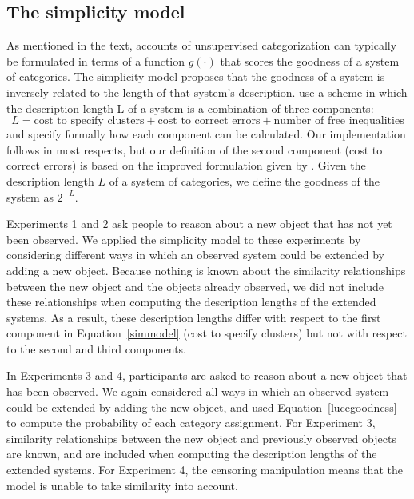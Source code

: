 \documentclass[doc]{apa6}
\begin{document}
\subsection{The simplicity model}

As mentioned in the text, accounts of unsupervised categorization can
typically be formulated in terms of a function $g(\cdot)$ that
scores the goodness of a system of categories. The simplicity model
proposes that the goodness of a system is inversely related to the length
of that system's description.  
 use a scheme in which the
description length L of a system is a combination of three components:
\begin{equation}
L =  \text{cost to specify clusters} +  \text{cost to correct errors} + \text{number of free inequalities}
\label{simmodel}
\end{equation}
and specify formally how each component can be calculated. Our implementation
follows  in most respects, but our definition of
the second component (cost to correct errors) is based on the improved
formulation given by .  Given the description length $L$ of a
system of categories, we define the goodness of the system as $2^{-L}$.

Experiments 1 and 2 ask people to reason about a new object that has not yet
been observed. We applied the simplicity model to these experiments by
considering different ways in which an observed system could be extended
by adding a new object. Because nothing is known about the similarity
relationships between the new object and the objects already observed, we did
not include these relationships when computing the description lengths of
the extended systems.  As a result, these description lengths differ with
respect to the first component in Equation~\ref{simmodel} (cost to
specify clusters) but not with respect to the second and third components.

In Experiments 3 and 4, participants are asked to reason about a new object that has been observed.  We again considered all ways in which an observed system could be extended by adding the new object, and used Equation~\ref{lucegoodness} to compute the probability of each category assignment. For Experiment 3, similarity relationships between the new object and previously observed objects are known, and are included when computing the description lengths of the extended systems. For Experiment 4, the censoring manipulation means that the model is unable to take similarity into account.
\end{document}
